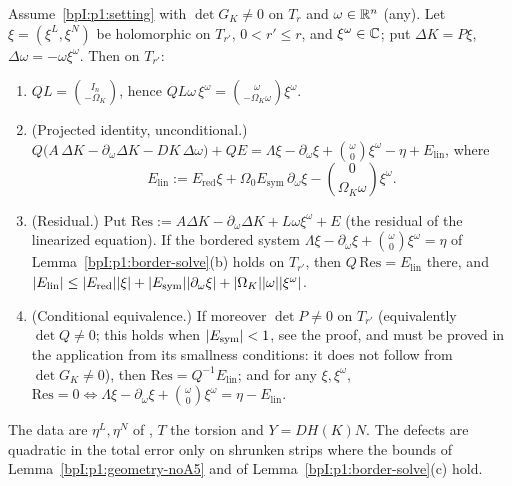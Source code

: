 \begin{lemma}\label{bpI:p1:reduced}
Assume~\ref{bpI:p1:setting} with $\det G_K\ne0$ on $T_r$ and $\omega\in\mathbb{R}^n$ (any). Let $\xi=(\xi^L,\xi^N)$ be holomorphic on $T_{r'}$, $0<r'\le r$,
and $\xi^\omega\in\mathbb{C}$; put $\Delta K=P\xi$, $\Delta\omega=-\omega\xi^\omega$. Then on $T_{r'}$:
\begin{enumerate}[label=(\alph*)]
\item $QL=\binom{I_n}{-\Omega_K}$, hence $QL\omega\,\xi^\omega=\binom{\omega}{-\Omega_K\omega}\xi^\omega$.
\item (Projected identity, unconditional.) $Q\bigl(A\,\Delta K-\partial_\omega\Delta K-DK\,\Delta\omega\bigr)+QE=\Lambda\xi-\partial_\omega\xi+\binom{\omega}{0}\xi^\omega-\eta+E_{\mathrm{lin}}$, where
  \[
  E_{\mathrm{lin}}:=E_{\mathrm{red}}\xi+\Omega_0E_{\mathrm{sym}}\,\partial_\omega\xi-\binom{0}{\Omega_K\omega}\xi^\omega .
  \]
\item (Residual.) Put $\mathrm{Res}:=A\Delta K-\partial_\omega\Delta K+L\omega\xi^\omega+E$ (the residual of the linearized equation). If the bordered system
$\Lambda\xi-\partial_\omega\xi+\binom\omega0\xi^\omega=\eta$ of Lemma~\ref{bpI:p1:border-solve}(b) holds on $T_{r'}$, then $Q\,\mathrm{Res}=E_{\mathrm{lin}}$ there, and
$\lvert E_{\mathrm{lin}}\rvert\le\lvert E_{\mathrm{red}}\rvert\lvert \xi\rvert+\lvert E_{\mathrm{sym}}\rvert\lvert \partial_\omega\xi\rvert+\lvert \Omega_K\rvert\lvert \omega\rvert\lvert \xi^\omega\rvert$.
\item (Conditional equivalence.) If moreover $\det P\ne0$ on $T_{r'}$ (equivalently $\det Q\ne0$; this holds when $\lvert E_{\mathrm{sym}}\rvert<1$, see the proof, and must be
proved in the application from its smallness conditions: it does not follow from $\det G_K\ne0$), then $\mathrm{Res}=Q^{-1}E_{\mathrm{lin}}$; and for any $\xi,\xi^\omega$,
$\mathrm{Res}=0\iff\Lambda\xi-\partial_\omega\xi+\binom\omega0\xi^\omega=\eta-E_{\mathrm{lin}}$.
\end{enumerate}
The data are $\eta^L,\eta^N$ of , $T$ the torsion and $Y=DH(K)N$. The defects are quadratic in the total error only on shrunken strips where the bounds of
Lemma~\ref{bpI:p1:geometry-noA5} and of Lemma~\ref{bpI:p1:border-solve}(c) hold.
\end{lemma}

